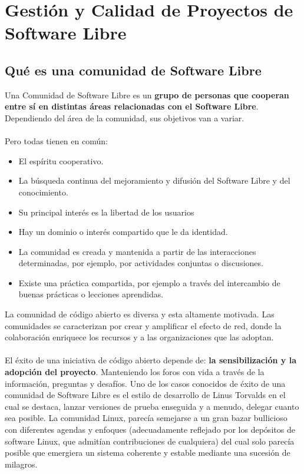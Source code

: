 \chapter{Gestión y Calidad de Proyectos de Software Libre}

\section{Qué es una comunidad de Software Libre}

Una Comunidad de Software Libre es un {\bf grupo de personas que cooperan entre sí en distintas áreas relacionadas con el Software Libre}. Dependiendo del área de la comunidad, sus objetivos van a variar.
\\
\\
Pero todas tienen en común:
\begin{itemize}
     \item El espíritu cooperativo. 
     \item La búsqueda continua del mejoramiento y difusión del Software Libre y del conocimiento.
     \item Su principal interés es la libertad de los usuarios
     \item Hay un dominio o interés compartido que le da identidad.
     \item La comunidad es creada y mantenida a partir de las interacciones determinadas, por ejemplo, por actividades conjuntas o discusiones.
     \item Existe una práctica compartida, por ejemplo a través del intercambio de buenas prácticas o lecciones aprendidas.
\end{itemize}

La comunidad de código abierto es diversa y esta altamente motivada. Las comunidades se caracterizan por crear y amplificar el efecto de red, donde la colaboración enriquece los recursos y a las organizaciones que las adoptan.
\\
\\
El éxito de una iniciativa de código abierto depende de: {\bf la sensibilización y la adopción del proyecto}. Manteniendo los foros con vida a través de la información, preguntas y desafíos.
Uno de los casos conocidos de éxito de una comunidad de Software Libre es el estilo de desarrollo de Linus Torvalds en el cual se destaca, lanzar versiones de prueba enseguida y a menudo, delegar cuanto sea posible. La comunidad Linux, parecía semejarse a un gran bazar bullicioso con diferentes agendas y enfoques (adecuadamente reflejado por los depósitos de software Linux, que admitían contribuciones de cualquiera) del cual solo parecía posible que emergiera un sistema coherente y estable mediante una sucesión de milagros. 

